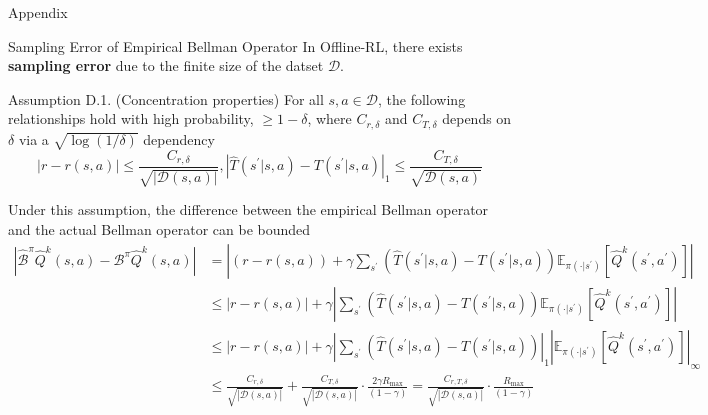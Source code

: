 \documentclass[11pt]{beamer}
\newcommand{\mbb}[1]{\mathbb{#1}}
\newcommand{\mc}[1]{\mathcal{#1}}
\newcommand{\tb}[1]{\textbf{#1}}
\newcommand{\abs}[1]{\left\lvert #1 \right\rvert}
\begin{document}
\begin{frame}{Appendix}
  \begin{block}{Sampling Error of Empirical Bellman Operator} \label{appendix:sampling_error}
    In Offline-RL, there exists \tb{sampling error} due to the finite size of the datset $\mc{D}$.

    \begin{block}{Assumption D.1. (Concentration properties)}
      For all $s,a \in \mc{D}$, the following relationships hold with high probability, $\geq 1-\delta$, where $C_{r,\delta}$ and $C_{T,\delta}$ depends on $\delta$ via a $\sqrt{\log(1/\delta)}$ dependency
      \[
        \abs{r - r(s,a)} \leq \frac{C_{r,\delta}}{\sqrt{\abs{\mc{D}(s,a)}}}, \abs{\hat{T}(s^\prime|s,a) - T(s^\prime |s,a)}_1 \leq \frac{C_{T,\delta}}{\sqrt{\mc{D}(s,a)}}
      \]
    \end{block}
    Under this assumption, the difference between the empirical Bellman operator and the actual Bellman operator can be bounded
    \[
      \begin{aligned}
        \abs{\hat{\mc{B}}^\pi \hat{Q}^k (s,a) - \mc{B}^\pi \hat{Q}^k (s,a)} &= \abs{ (r - r(s,a)) + \gamma \sum_{s^\prime} \left(\hat{T}(s^\prime|s,a) - T(s^\prime |s,a)\right)\mbb{E}_{\pi(\cdot | s^\prime)}\left[ \hat{Q}^k (s^\prime, a^\prime)\right]} \\
        & \leq \abs{r - r(s,a)} + \gamma \abs{\sum_{s^\prime} \left(\hat{T}(s^\prime |s,a) - T(s^\prime |s,a)\right)\mbb{E}_{\pi(\cdot | s^\prime)}\left[\hat{Q}^k (s^\prime, a^\prime)\right]} \\
        &\leq \abs{r - r(s,a)} + \gamma \abs{\sum_{s^\prime} \left(\hat{T}(s^\prime|s,a) - T(s^\prime|s,a)\right)}_1 \abs{\mbb{E}_{\pi(\cdot | s^\prime)}\left[\hat{Q}^k(s^\prime, a^\prime)\right]}_\infty \\
        &\leq \frac{C_{r,\delta}}{\sqrt{\abs{\mc{D}(s,a)}}} + \frac{C_{T,\delta}}{\sqrt{\abs{\mc{D}(s,a)}}} \cdot \frac{2\gamma R_{\text{max}}}{(1-\gamma)} = \frac{C_{r,T,\delta}}{\sqrt{\abs{\mc{D}(s,a)}}} \cdot \frac{R_{\text{max}}}{(1-\gamma)}
      \end{aligned}
    \]
  \end{block}
\end{frame}
\end{document}
